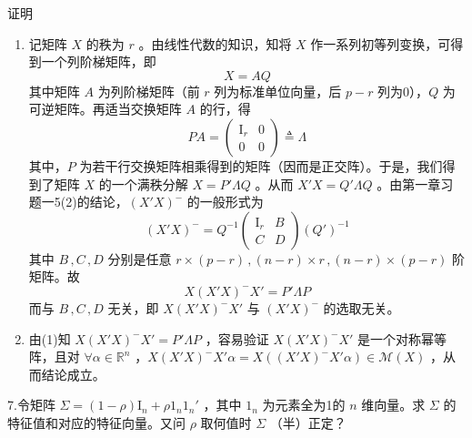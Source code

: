\documentclass[12pt,hyperref,]{ctexart}
\begin{document}
\heiti

证明

\songti

\begin{enumerate}
\def\labelenumi{(\arabic{enumi})}
\item
  记矩阵 \(X\) 的秩为 \(r\) 。由线性代数的知识，知将 \(X\)
  作一系列初等列变换，可得到一个列阶梯矩阵，即 \begin{equation*}
  X=AQ
  \end{equation*}其中矩阵 \(A\) 为列阶梯矩阵（前 \(r\)
  列为标准单位向量，后 \(p-r\) 列为0），\(Q\) 为可逆矩阵。再适当交换矩阵
  \(A\) 的行，得 \begin{equation*}
  PA=
  \begin{pmatrix}
  \mathrm{I}_r & 0 \\
  0 & 0
  \end{pmatrix}\triangleq \Lambda
  \end{equation*}其中，\(P\)
  为若干行交换矩阵相乘得到的矩阵（因而是正交阵）。于是，我们得到了矩阵
  \(X\) 的一个满秩分解 \(X=P'\Lambda Q\) 。从而 \(X'X=Q'\Lambda Q\)
  。由第一章习题一5(2)的结论，\((X'X)^-\) 的一般形式为 \begin{equation*}
  (X'X)^-=Q^{-1}
  \begin{pmatrix}
  \mathrm{I}_r & B \\
  C & D
  \end{pmatrix}(Q')^{-1}
  \end{equation*}其中 \(B\, ,C\, ,D\) 分别是任意
  \(r\times (p-r)\, ,(n-r)\times r\, ,(n-r)\times (p-r)\) 阶矩阵。故
  \begin{equation*}
  X(X'X)^-X'=P'\Lambda P
  \end{equation*}而与 \(B\, ,C\, ,D\) 无关，即 \(X(X'X)^-X'\) 与
  \((X'X)^-\) 的选取无关。
\item
  由(1)知 \(X(X'X)^-X'=P'\Lambda P\) ，容易验证 \(X(X'X)^-X'\)
  是一个对称幂等阵，且对 \(\forall \alpha \in \mathbb{R}^n\)
  ，\(X(X'X)^-X'\alpha =X((X'X)^-X'\alpha)\in \mathcal{M}(X)\)
  ，从而结论成立。
\end{enumerate}

\vspace{3em}

\kaishu

7.令矩阵 \(\Sigma =(1-\rho)\mathrm{I}_n+\rho 1_n1_n'\) ，其中 \(1_n\)
为元素全为1的 \(n\) 维向量。求 \(\Sigma\) 的特征值和对应的特征向量。又问
\(\rho\) 取何值时 \(\Sigma\) （半）正定？ \vspace{1em}

\heiti
\end{document}
